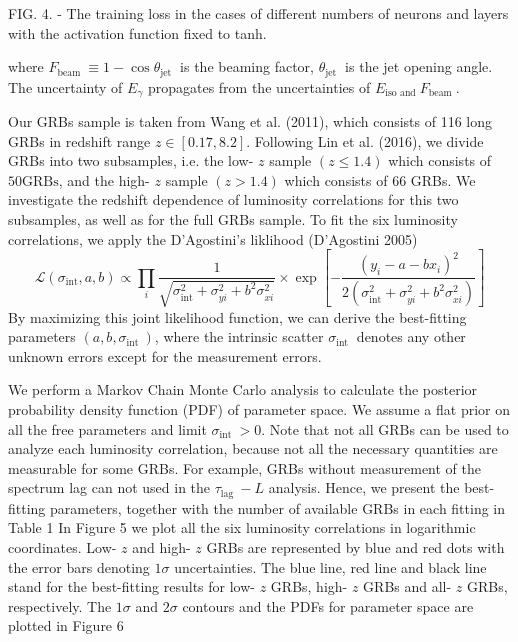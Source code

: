 \documentclass[10pt, a4paper]{article}
\begin{document}
FIG. 4. - The training loss in the cases of different numbers of neurons and layers with the activation function fixed to tanh.

where $F_{\text {beam }} \equiv 1-\cos \theta_{\text {jet }}$ is the beaming factor, $\theta_{\text {jet }}$ is the jet opening angle. The uncertainty of $E_{\gamma}$ propagates from the uncertainties of $E_{\text {iso and }} F_{\text {beam }}$.

Our GRBs sample is taken from Wang et al. (2011), which consists of 116 long GRBs in redshift range $z \in[0.17,8.2]$. Following Lin et al. (2016), we divide GRBs into two subsamples, i.e. the low- $z$ sample $(z \leq 1.4)$ which consists of $50 \mathrm{GRBs}$, and the high- $z$ sample $(z>1.4)$ which consists of 66 GRBs. We investigate the redshift dependence of luminosity correlations for this two subsamples, as well as for the full GRBs sample. To fit the six luminosity correlations, we apply the D'Agostini's liklihood (D'Agostini 2005)
$$
\mathcal{L}\left(\sigma_{\mathrm{int}}, a, b\right) \propto \prod_{i} \frac{1}{\sqrt{\sigma_{\mathrm{int}}^{2}+\sigma_{y i}^{2}+b^{2} \sigma_{x i}^{2}}} \times \exp \left[-\frac{\left(y_{i}-a-b x_{i}\right)^{2}}{2\left(\sigma_{\mathrm{int}}^{2}+\sigma_{y i}^{2}+b^{2} \sigma_{x i}^{2}\right)}\right]
$$
By maximizing this joint likelihood function, we can derive the best-fitting parameters $\left(a, b, \sigma_{\text {int }}\right)$, where the intrinsic scatter $\sigma_{\text {int }}$ denotes any other unknown errors except for the measurement errors.

We perform a Markov Chain Monte Carlo analysis to calculate the posterior probability density function (PDF) of parameter space. We assume a flat prior on all the free parameters and limit $\sigma_{\text {int }}>0$. Note that not all GRBs can be used to analyze each luminosity correlation, because not all the necessary quantities are measurable for some GRBs. For example, GRBs without measurement of the spectrum lag can not used in the $\tau_{\text {lag }}-L$ analysis. Hence, we present the best-fitting parameters, together with the number of available GRBs in each fitting in Table 1 In Figure 5 we plot all the six luminosity correlations in logarithmic coordinates. Low- $z$ and high- $z$ GRBs are represented by blue and red dots with the error bars denoting $1 \sigma$ uncertainties. The blue line, red line and black line stand for the best-fitting results for low- $z$ GRBs, high- $z$ GRBs and all- $z$ GRBs, respectively. The $1 \sigma$ and $2 \sigma$ contours and the PDFs for parameter space are plotted in Figure 6
\end{document}
